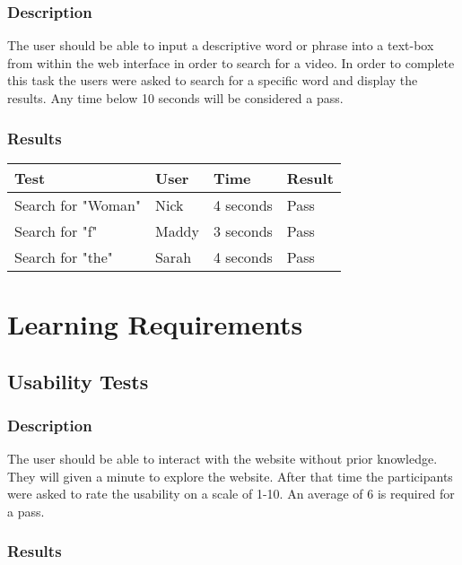 \documentclass{scrreprt}
\begin{document}
\subsubsection{Description}
\begin{flushleft}
The user should be able to input a descriptive word or phrase into a text-box from within the web interface in order to search for a video. In order to complete this task the users were asked to search for a specific word and display the results. Any time below 10 seconds will be considered a pass.
\subsubsection{Results}
\end{flushleft}

 \centering
 \begin{tabular}{||p{4.5cm}|p{2.5cm}|p{2.5cm}|p{2.5cm}||}
 \hline
 \bf Test & \bf User & \bf Time & \bf Result \\
 \hline\hline
   Search for "Woman" & Nick & 4 seconds  & Pass\\ %
 \hline\hline
   Search for "f" & Maddy & 3 seconds  & Pass\\
 \hline\hline
   Search for "the" & Sarah & 4 seconds  & Pass\\
 \hline
 \end{tabular}

\section{Learning Requirements}

\subsection{Usability Tests}
\subsubsection{Description}
\begin{flushleft}
The user should be able to interact with the website without prior knowledge. They will given a minute to explore the website. After that time the participants were asked to rate the usability on a scale of 1-10. An average of 6 is required for a pass.
\subsubsection{Results}
\end{flushleft}
\end{document}
